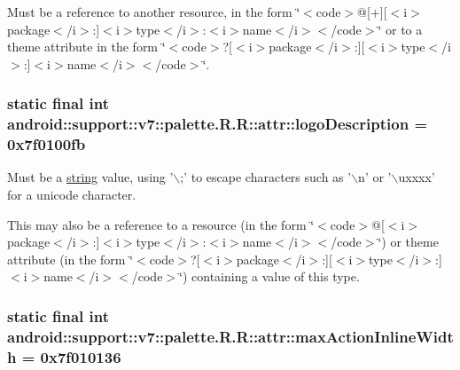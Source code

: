 Must be a reference to another resource, in the form \char`\"{}$<$code$>$@\mbox{[}+\mbox{]}\mbox{[}$<$i$>$package$<$/i$>$:\mbox{]}$<$i$>$type$<$/i$>$:$<$i$>$name$<$/i$>$$<$/code$>$\char`\"{} or to a theme attribute in the form \char`\"{}$<$code$>$?\mbox{[}$<$i$>$package$<$/i$>$:\mbox{]}\mbox{[}$<$i$>$type$<$/i$>$:\mbox{]}$<$i$>$name$<$/i$>$$<$/code$>$\char`\"{}. \hypertarget{classandroid_1_1support_1_1v7_1_1palette_1_1_r_1_1attr_c0bcde1cf7d2f3d0313501b56015dca6}{
\subsubsection[{logoDescription}]{\setlength{\rightskip}{0pt plus 5cm}static final int android::support::v7::palette.R.R::attr::logoDescription = 0x7f0100fb}}
\label{classandroid_1_1support_1_1v7_1_1palette_1_1_r_1_1attr_c0bcde1cf7d2f3d0313501b56015dca6}


Must be a \hyperlink{classandroid_1_1support_1_1v7_1_1palette_1_1_r_1_1string}{string} value, using '$\backslash$;' to escape characters such as '$\backslash$n' or '$\backslash$uxxxx' for a unicode character. 

This may also be a reference to a resource (in the form \char`\"{}$<$code$>$@\mbox{[}$<$i$>$package$<$/i$>$:\mbox{]}$<$i$>$type$<$/i$>$:$<$i$>$name$<$/i$>$$<$/code$>$\char`\"{}) or theme attribute (in the form \char`\"{}$<$code$>$?\mbox{[}$<$i$>$package$<$/i$>$:\mbox{]}\mbox{[}$<$i$>$type$<$/i$>$:\mbox{]}$<$i$>$name$<$/i$>$$<$/code$>$\char`\"{}) containing a value of this type. \hypertarget{classandroid_1_1support_1_1v7_1_1palette_1_1_r_1_1attr_5c2fc41aa46d79382f3e5bfd0300dbce}{
\subsubsection[{maxActionInlineWidth}]{\setlength{\rightskip}{0pt plus 5cm}static final int android::support::v7::palette.R.R::attr::maxActionInlineWidth = 0x7f010136}}
\label{classandroid_1_1support_1_1v7_1_1palette_1_1_r_1_1attr_5c2fc41aa46d79382f3e5bfd0300dbce}


